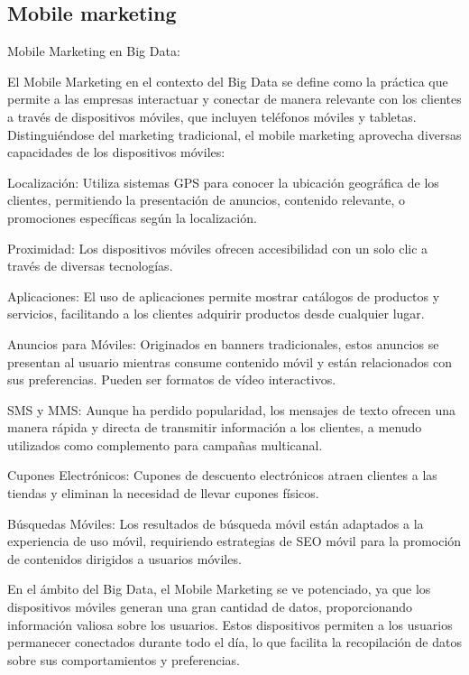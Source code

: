 \documentclass[
    a4paper, %
    10pt, %
    unnumberedsections, %
    twoside, %
]{LTJournalArticle}
\begin{document}
\subsection{Mobile marketing}

Mobile Marketing en Big Data:

El Mobile Marketing en el contexto del Big Data se define como la práctica que permite a las empresas interactuar y conectar de manera relevante con los clientes a través de dispositivos móviles, que incluyen teléfonos móviles y tabletas. Distinguiéndose del marketing tradicional, el mobile marketing aprovecha diversas capacidades de los dispositivos móviles:

Localización: Utiliza sistemas GPS para conocer la ubicación geográfica de los clientes, permitiendo la presentación de anuncios, contenido relevante, o promociones específicas según la localización.

Proximidad: Los dispositivos móviles ofrecen accesibilidad con un solo clic a través de diversas tecnologías.

Aplicaciones: El uso de aplicaciones permite mostrar catálogos de productos y servicios, facilitando a los clientes adquirir productos desde cualquier lugar.

Anuncios para Móviles: Originados en banners tradicionales, estos anuncios se presentan al usuario mientras consume contenido móvil y están relacionados con sus preferencias. Pueden ser formatos de vídeo interactivos.

SMS y MMS: Aunque ha perdido popularidad, los mensajes de texto ofrecen una manera rápida y directa de transmitir información a los clientes, a menudo utilizados como complemento para campañas multicanal.

Cupones Electrónicos: Cupones de descuento electrónicos atraen clientes a las tiendas y eliminan la necesidad de llevar cupones físicos.

Búsquedas Móviles: Los resultados de búsqueda móvil están adaptados a la experiencia de uso móvil, requiriendo estrategias de SEO móvil para la promoción de contenidos dirigidos a usuarios móviles.

En el ámbito del Big Data, el Mobile Marketing se ve potenciado, ya que los dispositivos móviles generan una gran cantidad de datos, proporcionando información valiosa sobre los usuarios. Estos dispositivos permiten a los usuarios permanecer conectados durante todo el día, lo que facilita la recopilación de datos sobre sus comportamientos y preferencias.
\end{document}
